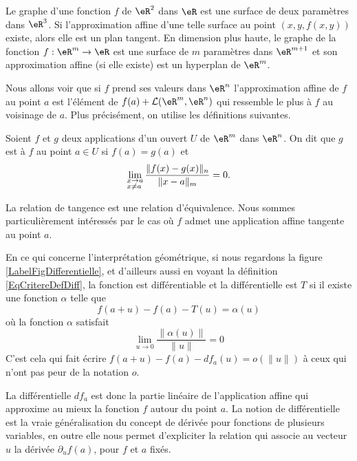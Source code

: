 Le graphe d'une fonction $f$ de $\eR^2$ dans $\eR$ est une surface de deux paramètres dans $\eR^3$. Si l'approximation affine d'une telle surface au point $(x,y,f(x,y))$ existe, alors elle est un plan tangent. En dimension plus haute, le graphe de la fonction $f:\eR^m\to\eR$ est une surface de $m$ paramètres dans $\eR^{m+1}$ et son approximation affine (si elle existe) est un hyperplan de $\eR^m$. 

Nous allons voir que si $f$ prend ses valeurs dans $\eR^n$ l'approximation affine de $f$ au point $a$ est l'élément de $ f(a)+\mathcal{L}(\eR^m,\eR^n)$ qui ressemble le plus à $f$ au voisinage de $a$. Plus précisément, on utilise les définitions suivantes.         
\begin{definition}
  Soient $f$ et $g$ deux applications d'un ouvert $U$ de $\eR^m$ dans $\eR^n$. On dit que $g$ est  à $f$ au point $a\in U$ si $f(a)=g(a)$ et 
\[
\lim_{\begin{subarray}{l}
    x\to a\\ x\neq a
  \end{subarray}}\frac{\|f(x)-g(x)\|_n}{\|x-a\|_m}=0.
\]
\end{definition}
La relation de tangence est une relation d'équivalence. Nous sommes particulièrement intéressés par le cas où $f$ admet une application  affine tangente au point $a$. 


\newcommand{\CaptionFigDifferentielle}{Interprétation géométrique de la différentielle.}

En ce qui concerne l'interprétation géométrique, si nous regardons la figure \ref{LabelFigDifferentielle}, et d'ailleurs aussi en voyant la définition \ref{EqCritereDefDiff}, la fonction est différentiable et la différentielle est \( T\) si il existe une fonction \( \alpha\) telle que
\begin{equation}
    f(a+u)-f(a)-T(u)=\alpha(u)
\end{equation}
où la fonction \( \alpha\) satisfait
\begin{equation}		\label{EqPresqueTa}
	\lim_{u\to 0} \frac{ \| \alpha(u)\| }{\| u \|}=0
\end{equation}
C'est cela qui fait écrire \( f(a+u)-f(a)-df_a(u)=o(\| u \|)\) à ceux qui n'ont pas peur de la notation \( o\).

La différentielle $df_a$ est donc la partie linéaire de l'application affine qui approxime au mieux la fonction $f$ autour du point $a$. La notion de différentielle est la vraie généralisation du concept de dérivée pour fonctions de plusieurs variables, en outre elle nous permet d'expliciter la relation qui associe au vecteur $u$ la dérivée $\partial_u f(a)$, pour $f$ et $a$ fixés.  

